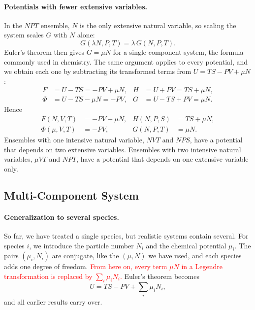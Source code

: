 \paragraph{Potentials with fewer extensive variables.}
In the $NPT$ ensemble, $N$ is the only extensive natural variable, so scaling
the system scales $G$ with $N$ alone:
\begin{equation*}
    G(\lambda N,P,T)=\lambda\,G(N,P,T).
\end{equation*}
Euler's theorem then gives $G=\mu N$ for a single-component system, the
formula commonly used in chemistry. The same argument applies to every
potential, and we obtain each one by subtracting its transformed terms from
$U=TS-PV+\mu N$:
\begin{align*}
    F&=U-TS=-PV+\mu N, &H&=U+PV=TS+\mu N,\\
    \Phi&=U-TS-\mu N=-PV, &G&=U-TS+PV=\mu N.
\end{align*}
Hence
\begin{equation}
    \boxed{
    \begin{aligned}
        F(N,V,T)&=-PV+\mu N, &H(N,P,S)&=TS+\mu N,\\
        \Phi(\mu,V,T)&=-PV, &G(N,P,T)&=\mu N.
    \end{aligned}}
\end{equation}
Ensembles with one intensive natural variable, $NVT$ and $NPS$, have a
potential that depends on two extensive variables. Ensembles with two
intensive natural variables, $\mu VT$ and $NPT$, have a potential that
depends on one extensive variable only.

\subsection{Multi-Component System}

\paragraph{Generalization to several species.}
So far, we have treated a single species, but realistic systems contain
several. For species $i$, we introduce the particle number $N_i$ and the
chemical potential $\mu_i$. The pairs $(\mu_i,N_i)$ are conjugate, like the
$(\mu,N)$ we have used, and each species adds one degree of freedom.
\textcolor{red}{From here on, every term $\mu N$ in a Legendre transformation
is replaced by $\sum_i\mu_iN_i$.} Euler's theorem becomes
\begin{equation}
    \boxed{U=TS-PV+\sum_i\mu_iN_i,}
\end{equation}
and all earlier results carry over.

